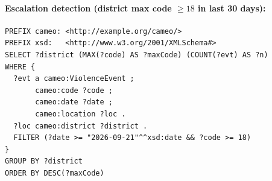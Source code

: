 \documentclass[11pt,a4paper]{article}
\begin{document}
\paragraph{Escalation detection (district max code $\geq 18$ in last 30 days):}
\begin{verbatim}
PREFIX cameo: <http://example.org/cameo/>
PREFIX xsd:   <http://www.w3.org/2001/XMLSchema#>
SELECT ?district (MAX(?code) AS ?maxCode) (COUNT(?evt) AS ?n)
WHERE {
  ?evt a cameo:ViolenceEvent ;
       cameo:code ?code ;
       cameo:date ?date ;
       cameo:location ?loc .
  ?loc cameo:district ?district .
  FILTER (?date >= "2026-09-21"^^xsd:date && ?code >= 18)
}
GROUP BY ?district
ORDER BY DESC(?maxCode)
\end{verbatim}
\end{document}
